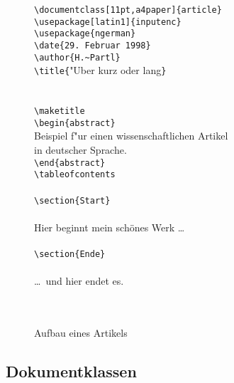 \begin{figure}[hbtp] %
\oben{10cm}
\begin{flushleft}\ttfamily
\verb+\documentclass[11pt,a4paper]{article}+\\
\verb+\usepackage[latin1]{inputenc}+\\
\verb+\usepackage{ngerman}+\\
\verb+\date{29. Februar 1998}+\\
\verb+\author{H.~Partl}+\\
\verb+\title{+"Uber kurz oder lang\verb+}+\\
\ \\
\verb++\\
\verb+\maketitle+\\
\verb+\begin{abstract}+\\
Beispiel f"ur einen wissenschaftlichen Artikel\\
in deutscher Sprache.\\
\verb+\end{abstract}+\\
\verb+\tableofcontents+\\
\ \\
\verb+\section{Start}+\\
\ \\
Hier beginnt mein schönes Werk \dots\\
\ \\
\verb+\section{Ende}+\\
\ \\
\dots\ und hier endet es.\\
\ \\
\verb++\\[1\baselineskip]
\end{flushleft}
\unten
\caption{Aufbau eines Artikels} \label{dokument}
\end{figure}
 
 
\subsection{Dokumentklassen}\label{docsty}
 

